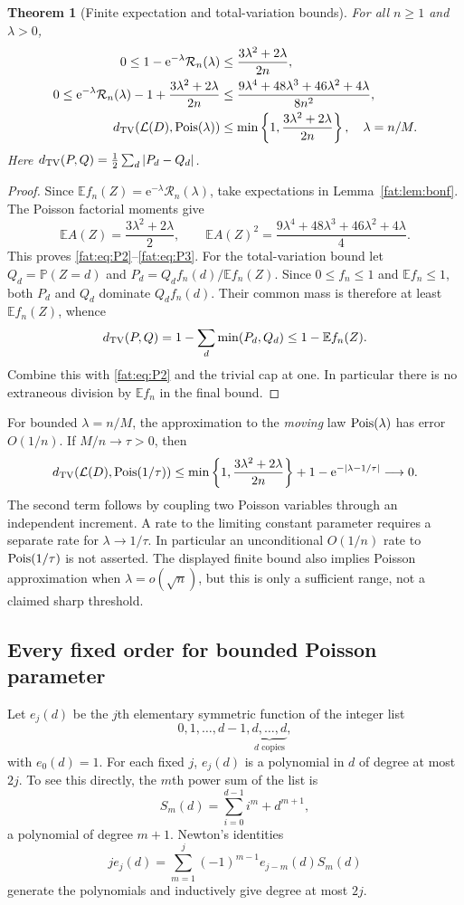 \documentclass[11pt,letterpaper]{article}
\numberwithin{equation}{section}
\newtheorem{theorem}{Theorem}[section]
\theoremstyle{remark}\newtheorem{remark}[theorem]{Remark}
\newcommand{\E}{\mathbb E}\newcommand{\Prob}{\mathbb P}\newcommand{\ee}{\mathrm e}
\begin{document}
\begin{theorem}[Finite expectation and total-variation bounds]\label{fat:thm:TV}
For all $n\ge1$ and $\lambda>0$,
\begin{align}
 0\le1-\ee^{-\lambda}\mathcal R_n(\lambda)
 &\le\frac{3\lambda^2+2\lambda}{2n},\label{fat:eq:P2}\\
 0\le\ee^{-\lambda}\mathcal R_n(\lambda)-1+
 \frac{3\lambda^2+2\lambda}{2n}
 &\le\frac{9\lambda^4+48\lambda^3+46\lambda^2+4\lambda}{8n^2},\label{fat:eq:P3}\\
 \TV(\mathcal L(D),\Pois(\lambda))
 &\le\min\left\{1,\frac{3\lambda^2+2\lambda}{2n}\right\},\quad\lambda=n/M.\label{fat:eq:P4}
\end{align}
Here $d_{\mathrm{TV}}(P,Q)=\tfrac12\sum_d|P_d-Q_d|$.
\end{theorem}
\begin{proof}
Since $\E f_n(Z)=\ee^{-\lambda}\mathcal R_n(\lambda)$, take expectations in Lemma~\ref{fat:lem:bonf}. The Poisson factorial moments give
\[
 \E A(Z)=\frac{3\lambda^2+2\lambda}{2},\qquad
 \E A(Z)^2=\frac{9\lambda^4+48\lambda^3+46\lambda^2+4\lambda}{4}.
\]
This proves \eqref{fat:eq:P2}--\eqref{fat:eq:P3}. For the total-variation bound let $Q_d=\Prob(Z=d)$ and $P_d=Q_df_n(d)/\E f_n(Z)$. Since $0\le f_n\le1$ and $\E f_n\le1$, both $P_d$ and $Q_d$ dominate $Q_df_n(d)$. Their common mass is therefore at least $\E f_n(Z)$, whence
\[
 \TV(P,Q)=1-\sum_d\min(P_d,Q_d)\le1-\E f_n(Z).
\]
Combine this with \eqref{fat:eq:P2} and the trivial cap at one. In particular there is no extraneous division by $\E f_n$ in the final bound.
\end{proof}

For bounded $\lambda=n/M$, the approximation to the \emph{moving} law $\operatorname{Pois}(\lambda)$ has error $O(1/n)$. If $M/n\to\tau>0$, then
\[
 \TV(\mathcal L(D),\Pois(1/\tau))
 \le\min\left\{1,\frac{3\lambda^2+2\lambda}{2n}\right\}
 +1-\ee^{-|\lambda-1/\tau|}\longrightarrow0.
\]
The second term follows by coupling two Poisson variables through an independent increment. A rate to the limiting constant parameter requires a separate rate for $\lambda\to1/\tau$. In particular an unconditional $O(1/n)$ rate to $\operatorname{Pois}(1/\tau)$ is not asserted. The displayed finite bound also implies Poisson approximation when $\lambda=o(\sqrt n)$, but this is only a sufficient range, not a claimed sharp threshold.

\subsection{Every fixed order for bounded Poisson parameter}
Let $e_j(d)$ be the $j$th elementary symmetric function of the integer list
\[
 0,1,\ldots,d-1,\underbrace{d,\ldots,d}_{d\text{ copies}},
\]
with $e_0(d)=1$. For each fixed $j$, $e_j(d)$ is a polynomial in $d$ of degree at most $2j$. To see this directly, the $m$th power sum of the list is
\[
 S_m(d)=\sum_{i=0}^{d-1}i^m+d^{m+1},
\]
a polynomial of degree $m+1$. Newton's identities
\begin{equation}\label{fat:eq:newton}
 j e_j(d)=\sum_{m=1}^j(-1)^{m-1}e_{j-m}(d)S_m(d)
\end{equation}
generate the polynomials and inductively give degree at most $2j$.
\end{document}
